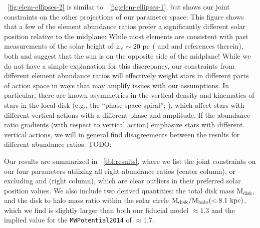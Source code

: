 \documentclass[modern]{aastex63}
\newcommand{\mdisk}{\ensuremath{\mathrm{M}_\mathrm{disk}}}
\newcommand{\mratio}{\ensuremath{\mdisk / \mdisk^\star}}
\newcommand{\hz}{\ensuremath{h_{z, \odot}}}
\newcommand{\zsun}{\ensuremath{z_\odot}}
\newcommand{\vzsun}{\ensuremath{v_{z, \odot}}}
\begin{document}
\figurename~\ref{fig:elem-ellipses-2} is similar to
\figurename~\ref{fig:elem-ellipses-1}, but shows our joint constraints on the
other projections of our parameter space:
This figure shows that a few of the element abundance ratios prefer a
significantly different solar position relative to the midplane:
While most elements are consistent with past measurements of the solar height of
$z_\odot \sim 20~\mathrm{pc}$ (\citealt{Bennett:2019} and \citealt{Bland-Hawthorn:2016}
and references therein), both  and  suggest
that the sun is on the opposite side of the midplane!
While we do not have a simple explanation for this discrepancy, our constraints
from different element abundance ratios will effectively weight stars in
different parts of action space in ways that may amplify issues with our
assumptions.
In particular, there are known asymmetries in the vertical density and
kinematics of stars in the local disk (e.g., the ``phase-space spiral'';
\citealt{Antoja:2018}), which affect stars with different vertical actions with
a different phase and amplitude.
If the abundance ratio gradients (with respect to vertical action) emphasize
stars with different vertical actions, we will in general find disagreements
between the results for different abundance ratios.
TODO:


Our results are summarized in \tablename~\ref{tbl:results}, where we list the
joint constraints on our four parameters utilizing all eight abundance ratios
(center column), or excluding  and  (right
column), which are clear outliers in their preferred solar position values.
We also include two derived quantities: the total disk mass $\mdisk$, and the
disk to halo mass ratio within the solar circle ${\rm M}_{\rm disk} / {\rm
M}_{\rm halo} (<8.1~\mathrm{kpc})$, which we find is slightly larger than both  our
fiducial model $\approx 1.3$ \citep{gala} and the implied value for the
\texttt{MWPotential2014} \citep{Bovy:2015} of $\approx 1.7$.

\end{document}
